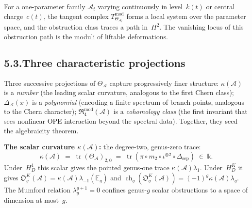 \documentclass[11pt]{report}
\theoremstyle{definition}
\theoremstyle{remark}
\providecommand{\cA}{\mathcal{A}}
\providecommand{\Bbbk}{\mathbb{k}}
\numberwithin{equation}{section}
\begin{document}
For a one-parameter family $\cA_t$ varying continuously in
level~$k(t)$ or central charge~$c(t)$, the tangent complex
$T^{\mathrm{mod}}_{\Theta_{\cA_t}}$ forms a local system over the
parameter space, and the obstruction class traces a path
in~$H^2$. The vanishing locus of this obstruction path is the
moduli of liftable deformations.

\subsection*{5.3.\enspace Three characteristic projections}

Three successive
projections of $\Theta_\cA$ capture progressively finer structure:
$\kappa(\cA)$ is a \emph{number} (the leading scalar curvature,
analogous to the first Chern class);
$\Delta_\cA(x)$ is a \emph{polynomial} (encoding a finite
spectrum of branch points, analogous to the Chern character);
$\mathfrak{R}^{\mathrm{mod}}_4(\cA)$ is a \emph{cohomology
class} (the first invariant that sees nonlinear OPE interaction
beyond the spectral data). Together, they
seed the algebraicity theorem.

\medskip

\noindent\textbf{The scalar curvature $\kappa(\cA)$:}\enspace
the degree-two, genus-zero trace:
\[
\kappa(\cA)
\;=\;
\operatorname{tr}(\Theta_\cA)_{2,0}
\;=\;
\operatorname{tr}(\pi\circ m_2\circ\iota^{\otimes 2}
\circ\Delta_{\mathrm{sep}})
\;\in\;\Bbbk.
\]
Under~$H_D^1$ this scalar gives the pointed genus-one trace
$\kappa(\cA)\lambda_1$.  Under~$H_D^K$ it gives
$\mathfrak O_g^K(\cA)=\kappa(\cA)\lambda_{-1}(\mathbb E_g)$ and
$\operatorname{ch}_g(\mathfrak O_g^K(\cA))=
(-1)^g\kappa(\cA)\lambda_g$.  The Mumford relation
$\lambda_g^{g+1}=0$ confines genus-$g$ scalar obstructions to a space of dimension at most~$g$.
\end{document}
